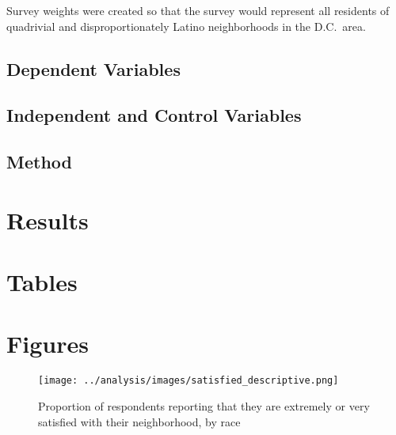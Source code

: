 \documentclass[11pt]{baderart}
\begin{document}
Survey weights were created so that the survey would represent all residents of quadrivial and disproportionately Latino neighborhoods in the D.C.\ area.

\subsection{Dependent Variables} 


\subsection{Independent and Control Variables}

\subsection{Method}

\section{Results}










\section{Tables}






\section{Figures}
\begin{figure}
\centering
\texttt{[image: ../analysis/images/satisfied\_descriptive.png]}
\caption{Proportion of respondents reporting that they are extremely or very satisfied with their neighborhood, by race}
\label{fig:satisfied}
\end{figure}
\end{document}
